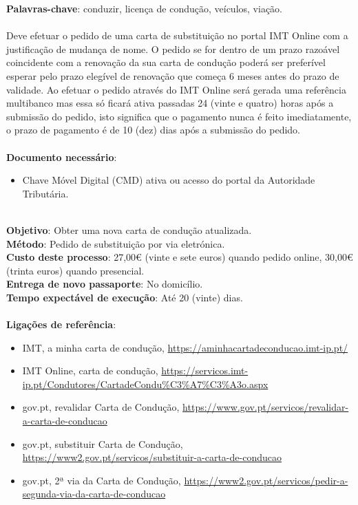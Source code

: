 \textbf{Palavras-chave}: conduzir, licença de condução, veículos, viação. \\
\\
Deve efetuar o pedido de uma carta de substituição no portal IMT Online
com a justificação de mudança de nome. O pedido se for dentro de um
prazo razoável coincidente com a renovação da sua carta de condução
poderá ser preferível esperar pelo prazo elegível de renovação que
começa 6 meses antes do prazo de validade. Ao efetuar o pedido através
do IMT Online será gerada uma referência multibanco mas essa só ficará
ativa passadas 24 (vinte e quatro) horas após a submissão do pedido,
isto significa que o pagamento nunca é feito imediatamente, o prazo de
pagamento é de 10 (dez) dias após a submissão do pedido. \\
\\
\textbf{Documento necessário}:
\begin{itemize}
	\item Chave Móvel Digital (CMD) ativa ou acesso do portal da Autoridade Tributária.
\end{itemize}
\leavevmode\\
\textbf{Objetivo}: Obter uma nova carta de condução atualizada. \\
\textbf{Método}: Pedido de substituição por via eletrónica. \\
\textbf{Custo deste processo}: 27,00€ (vinte e sete euros) quando pedido online, 30,00€ (trinta euros) quando presencial. \\
\textbf{Entrega de novo	passaporte}: No domicílio. \\
\textbf{Tempo expectável de execução}: Até 20 (vinte) dias. \\
\\
\textbf{Ligações de referência}:
\begin{itemize}
	\item IMT, a minha carta de condução, \url{https://aminhacartadeconducao.imt-ip.pt/}
	\item IMT Online, carta de condução, \url{https://servicos.imt-ip.pt/Condutores/CartadeCondu\%C3\%A7\%C3\%A3o.aspx}
	\item gov.pt, revalidar Carta de Condução, \url{https://www.gov.pt/servicos/revalidar-a-carta-de-conducao}
	\item gov.pt, substituir Carta de Condução, \url{https://www2.gov.pt/servicos/substituir-a-carta-de-conducao}
	\item gov.pt, 2ª via da Carta de Condução, \url{https://www2.gov.pt/servicos/pedir-a-segunda-via-da-carta-de-conducao}
\end{itemize}